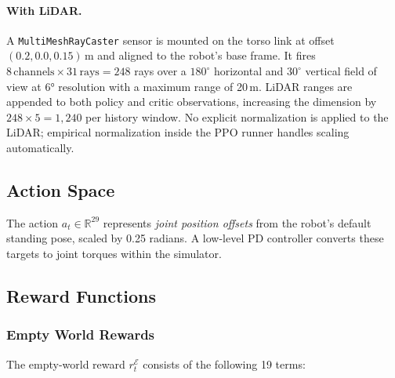 \documentclass{article}
\begin{document}
\paragraph{With LiDAR.}
A \texttt{MultiMeshRayCaster} sensor is mounted on the torso link at offset
$(0.2, 0.0, 0.15)$\,m and aligned to the robot's base frame.
It fires $8\,\text{channels} \times 31\,\text{rays} = 248$ rays over a
$180^\circ$ horizontal and $30^\circ$ vertical field of view at 6° resolution
with a maximum range of 20\,m.
LiDAR ranges are appended to both policy and critic observations, increasing
the dimension by $248 \times 5 = 1{,}240$ per history window.
No explicit normalization is applied to the LiDAR; empirical normalization
inside the PPO runner handles scaling automatically.

\subsection{Action Space}

The action $a_t \in \mathbb{R}^{29}$ represents \emph{joint position offsets}
from the robot's default standing pose, scaled by 0.25 radians.
A low-level PD controller converts these targets to joint torques within the
simulator.

\subsection{Reward Functions}

\subsubsection{Empty World Rewards}

The empty-world reward $r_t^\mathcal{E}$ consists of the following 19 terms:
\end{document}
